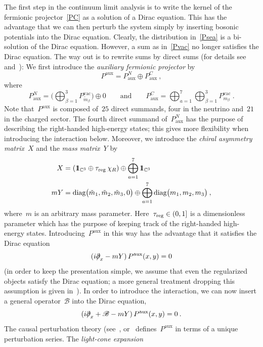 \documentclass[reqno,11pt]{amsart}
\numberwithin{equation}{section}
\newcommand{\beq}{\begin{equation}}
\newcommand{\eeq}{\end{equation}}
\newcommand{\C}{\mathbb{C}}
\newcommand{\1}{\mbox{\rm 1 \hspace{-1.05 em} 1}}
\newcommand{\Pdd}{\mbox{$\partial$ \hspace{-1.2 em} $/$}}
\newcommand{\B}{{\mathscr{B}}}
\newcommand{\reg}{\text{\rm{reg}}}
\begin{document}
The first step in the continuum limit analysis is to write the kernel of the fermionic projector~\eqref{PC}
as a solution of a Dirac equation. This has the advantage that we can then perturb the system
simply by inserting bosonic potentials into the Dirac equation.
Clearly, the distribution in~\eqref{Psea} is a bi-solution of the Dirac equation. However,
a sum as in~\eqref{Pvac} no longer satisfies the Dirac equation. The way out is to rewrite
sums by direct sums (for details see~\cite[Section~2.3]{pfp} and~\cite[Section~3.4 and~\S4.2.6]{cfs}):
We first introduce the {\em{auxiliary fermionic projector}} by
\beq \label{Pauxdef}
P^\text{aux} = P^N_\text{aux} \oplus P^C_\text{aux}\:,
\eeq
where
\beq \label{Paux}
P^N_\text{aux} = \Big( \bigoplus_{\beta=1}^3 P^\text{vac}_{\tilde{m}_\beta} \Big) \oplus 0
\qquad \text{and} \qquad
P^C_\text{aux} = \bigoplus_{a=1}^7 \bigoplus_{\beta=1}^3 P^\text{vac}_{m_\beta} \:.
\eeq
Note that~$P^\text{aux}$ is composed of~$25$ direct summands, four in the neutrino
and~$21$ in the charged sector. The fourth direct summand of~$P^N_\text{aux}$ has the purpose
of describing the right-handed high-energy states; this gives more flexibility when introducing the
interaction below. Moreover, we introduce the
{\em{chiral asymmetry matrix}}~$X$ and the {\em{mass matrix}}~$Y$ by
\begin{align}
X &= \left( \1_{\C^3} \oplus \tau_\reg \,\chi_R \right) \oplus \bigoplus_{a=1}^7 \1_{\C^3} \label{asymmetry}\\
m Y &= \text{diag} \big( \tilde{m}_1, \tilde{m}_2, \tilde{m}_3, 0 \big)
\oplus \bigoplus_{a=1}^7 \text{diag} \big( m_1, m_2, m_3 \big) \:,
\end{align}
where~$m$ is an arbitrary mass parameter.
Here~$\tau_\reg \in (0,1]$ is a dimensionless parameter which has the purpose of keeping track
of the right-handed high-energy states. Introducing~$P^\text{aux}$ in this way has the advantage
that it satisfies the Dirac equation
\beq \label{dirvac}
(i \Pdd_x - m Y) \,P^\text{aux}(x,y) = 0
\eeq
(in order to keep the presentation simple, we assume that even the regularized objects
satisfy the Dirac equation; a more general treatment dropping this assumption is given
in~\cite[Chapter~5]{cfs}).
In order to introduce the interaction, we can now insert a general operator~$\B$ into the Dirac equation,\beq \label{Dinteract}
(i \Pdd_x + \B - m Y)  \,P^\text{aux}(x,y)  = 0 \:.
\eeq
The causal perturbation theory (see~\cite[Section~2.2]{pfp}, \cite{norm} or~\cite[Section~2.1]{cfs}
defines~$P^\text{aux}$ in terms of a unique perturbation series. The {\em{light-cone expansion}}
\end{document}
